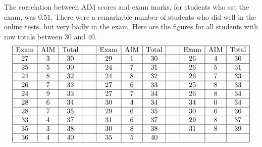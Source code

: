 \documentclass{amsart}
\begin{document}
The correlation between AIM scores and exam marks, for students who
sat the exam, was $0.51$.  There were a remarkable number of students
who did well in the online tests, but very badly in the exam.  Here
are the figures for all students with raw totals between 30 and 40.
\[ \begin{array}{|c|c|c|c|c|c|c|c|c|c|c|} \hline
\text{Exam} & \text{AIM} & \text{Total} & \hspace{1em} &
\text{Exam} & \text{AIM} & \text{Total} & \hspace{1em} &
\text{Exam} & \text{AIM} & \text{Total} \\ \hline
27 & 3 & 30 & \hspace{1em} &
29 & 1 & 30 & \hspace{1em} &
26 & 4 & 30 \\ \hline
25 & 5 & 30 & \hspace{1em} &
24 & 7 & 31 & \hspace{1em} &
26 & 5 & 31 \\ \hline
24 & 8 & 32 & \hspace{1em} &
24 & 8 & 32 & \hspace{1em} &
26 & 7 & 33 \\ \hline
26 & 7 & 33 & \hspace{1em} &
27 & 6 & 33 & \hspace{1em} &
25 & 8 & 33 \\ \hline
24 & 9 & 33 & \hspace{1em} &
27 & 7 & 34 & \hspace{1em} &
26 & 8 & 34 \\ \hline
28 & 6 & 34 & \hspace{1em} &
30 & 4 & 34 & \hspace{1em} &
34 & 0 & 34 \\ \hline
28 & 7 & 35 & \hspace{1em} &
29 & 6 & 35 & \hspace{1em} &
30 & 6 & 36 \\ \hline
33 & 4 & 37 & \hspace{1em} &
31 & 6 & 37 & \hspace{1em} &
29 & 8 & 37 \\ \hline
35 & 3 & 38 & \hspace{1em} &
30 & 8 & 38 & \hspace{1em} &
31 & 8 & 39 \\ \hline
36 & 4 & 40 & \hspace{1em} &
35 & 5 & 40 & \hspace{1em} &
   &   &    \\ \hline
\end{array}
\]
\end{document}
